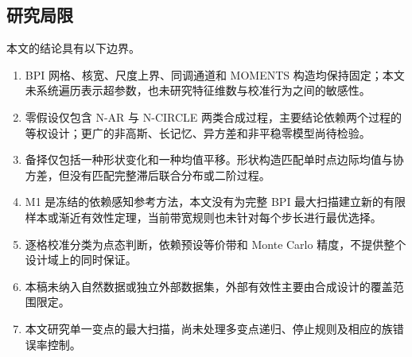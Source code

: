 \subsection{研究局限}\label{sec:limitations}

本文的结论具有以下边界。
\begin{enumerate}
\item BPI 网格、核宽、尺度上界、同调通道和 MOMENTS 构造均保持固定；本文未系统遍历表示超参数，也未研究特征维数与校准行为之间的敏感性。
\item 零假设仅包含 N-AR 与 N-CIRCLE 两类合成过程，主要结论依赖两个过程的等权设计；更广的非高斯、长记忆、异方差和非平稳零模型尚待检验。
\item 备择仅包括一种形状变化和一种均值平移。形状构造匹配单时点边际均值与协方差，但没有匹配完整滞后联合分布或二阶过程。
\item M1 是冻结的依赖感知参考方法，本文没有为完整 BPI 最大扫描建立新的有限样本或渐近有效性定理，当前带宽规则也未针对每个步长进行最优选择。
\item 逐格校准分类为点态判断，依赖预设等价带和 Monte Carlo 精度，不提供整个设计域上的同时保证。
\item 本稿未纳入自然数据或独立外部数据集，外部有效性主要由合成设计的覆盖范围限定。
\item 本文研究单一变点的最大扫描，尚未处理多变点递归、停止规则及相应的族错误率控制。
\end{enumerate}
